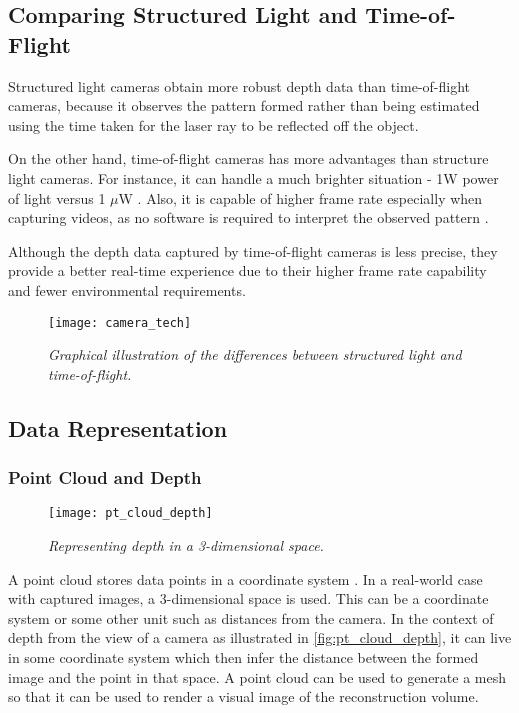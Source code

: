\subsection{Comparing Structured Light and Time-of-Flight}
Structured light cameras obtain more robust depth data than time-of-flight cameras, because it observes the pattern formed rather than being estimated using the time taken for the laser ray to be reflected off the object. 

On the other hand, time-of-flight cameras has more advantages than structure light cameras. For instance, it can handle a much brighter situation - 1W power of light versus 1 $\mu$W \cite{kinect-version-compare}. Also, it is capable of higher frame rate especially when capturing videos, as no software is required to interpret the observed pattern \cite{kinect-cam-tech}.

Although the depth data captured by time-of-flight cameras is less precise, they provide a better real-time experience due to their higher frame rate capability and fewer environmental requirements. 
\\

\begin{figure}[h]
  \centering
  \texttt{[image: camera\_tech]}
  \caption{\textit{Graphical illustration of the differences between structured light and time-of-flight.}}
  \label{fig:camera_tech}
\end{figure}


\newpage
\subsection{Data Representation} \label{ssec:lit-data_rep}
\subsubsection{Point Cloud and Depth}

\begin{figure}[ht]
  \centering
  \texttt{[image: pt\_cloud\_depth]}
  \caption{\textit{Representing depth in a 3-dimensional space.}}
  \label{fig:pt_cloud_depth}
\end{figure}

A point cloud stores data points in a coordinate system \cite{chi-book}. In a real-world case with captured images, a 3-dimensional space is used. This can be a coordinate system or some other unit such as distances from the camera. In the context of depth from the view of a camera as illustrated in \autoref{fig:pt_cloud_depth}, it can live in some coordinate system which then infer the distance between the formed image and the point in that space. A point cloud can be used to generate a mesh so that it can be used to render a visual image of the reconstruction volume.

